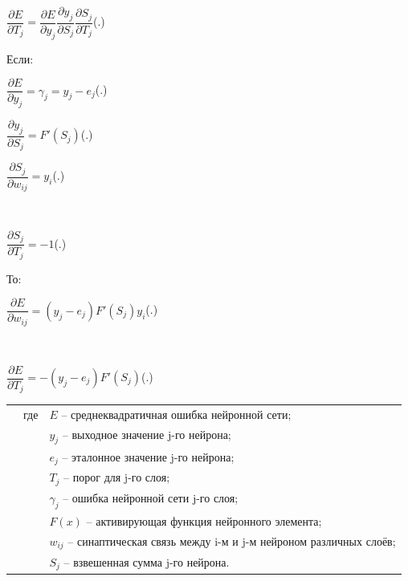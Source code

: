{	\formulaspace \par \redline 
	$\dfrac{\partial E}{\partial T_{j}} = \dfrac{\partial E}{\partial y_j} \dfrac{\partial y_j}{\partial S_j} \dfrac{\partial S_j}{\partial T_{j}}$\hfill (\thechaptercntr .\theformulacntr) \redline
	\formulaspace \addtocounter{formulacntr}{1}
	
	\par \redline Если:
	
	\formulaspace \par \redline 
	$\dfrac{\partial E}{\partial y_j} = \gamma_{j} =  y_{j} - e_{j}$\hfill (\thechaptercntr .\theformulacntr) \redline
	\formulaspace \addtocounter{formulacntr}{1}
	
	\formulaspace \par \redline 
	$\dfrac{\partial y_j}{\partial S_j} =  F'(S_{j})$\hfill (\thechaptercntr .\theformulacntr) \redline
	\formulaspace \addtocounter{formulacntr}{1}
	
	\formulaspace \par \redline 
	$\dfrac{\partial S_j}{\partial w_{ij}} =  y_{i}$\hfill (\thechaptercntr .\theformulacntr) \redline
	\formulaspace \addtocounter{formulacntr}{1}\\
	
	\formulaspace \par \redline 
	$\dfrac{\partial S_j}{\partial T_{j}} = -1 $\hfill (\thechaptercntr .\theformulacntr) \redline
	\formulaspace \addtocounter{formulacntr}{1}
	
	\par \redline То:
	
		\formulaspace \par \redline 
	$\dfrac{\partial E}{\partial w_{ij}} = (y_{j} - e_{j}) F'(S_{j}) y_{i}$\hfill (\thechaptercntr .\theformulacntr) \redline
	\formulaspace \addtocounter{formulacntr}{1}\\
	
	\formulaspace \par \redline 
	$\dfrac{\partial E}{\partial T_{j}} = - (y_{j} - e_{j})  F'(S_{j})$\hfill (\thechaptercntr .\theformulacntr) \redline
	\formulaspace \addtocounter{formulacntr}{1}
	
	\begin{tabular}{p{}p{}p{}}
		& где  & $E$ {--} среднеквадратичная ошибка нейронной сети; \\
		&      & $y_{j}$ {--} выходное значение j-го нейрона; \\
		&      & $e_{j}$ {--} эталонное значение j-го нейрона; \\
		&      & $T_{j}$ {--} порог для j-го слоя; \\
		&      & $\gamma_{j}$ {--} ошибка нейронной сети j-го слоя; \\
		&      & $F(x)$ {--} активирующая функция нейронного элемента; \\
		&      & $w_{ij}$ {--} синаптическая связь между i-м и j-м нейроном различных слоёв; \\
		&      & $S_{j}$ {--} взвешенная сумма j-го нейрона. \\
	\end{tabular}
	
}
